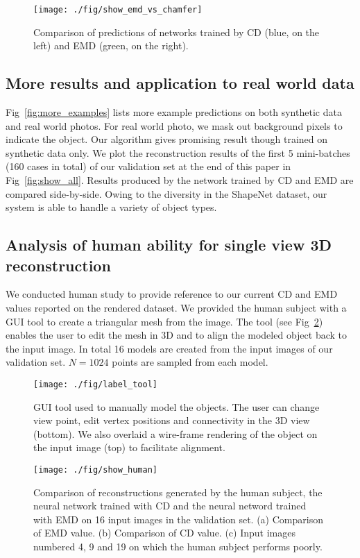 \documentclass[10pt,twocolumn,letterpaper]{article}
\begin{document}
\begin{figure}[ht!]
  \centering
  \texttt{[image: ./fig/show\_emd\_vs\_chamfer]}
  \caption{Comparison of predictions of networks trained by CD (blue, on the left) and EMD (green, on the right). }\label{fig:emd_vs_chamfer}
  \vspace{-1em}
\end{figure}\subsection{More results and application to real world data}\label{sec:exp:more}
 
Fig~\ref{fig:more_examples} lists more example predictions on both synthetic data and real world photos. For real world photo, we mask out background pixels to indicate the object. Our algorithm gives promising result though trained on synthetic data only.
We plot the reconstruction results of the first 5 mini-batches (160 cases in total) of our validation set at the end of this paper in Fig~\ref{fig:show_all}. Results produced by the network trained by CD and EMD are compared side-by-side. Owing to the diversity in the ShapeNet dataset, our system is able to handle a variety of object types.

\subsection{Analysis of human ability for single view 3D reconstruction}
We conducted human study to provide reference to our current CD and EMD values reported on the rendered dataset. We provided the human subject with a GUI tool to create a triangular mesh from the image. The tool (see Fig~\ref{fig:gui_tool}) enables the user to edit the mesh in 3D and to align the modeled object back to the input image. In total 16 models are created from the input images of our validation set. $N=1024$ points are sampled from each model.

\begin{figure}
\centering
\texttt{[image: ./fig/label\_tool]}
\caption{GUI tool used to manually model the objects. The user can change view point, edit vertex positions and connectivity in the 3D view (bottom). We also overlaid a wire-frame rendering of the object on the input image (top) to facilitate alignment.}
\label{fig:gui_tool}
\end{figure}\begin{figure}
\centering
\texttt{[image: ./fig/show\_human]}
\caption{Comparison of reconstructions generated by the human subject, the neural network trained with CD and the neural netword trained with EMD on 16 input images in the validation set. (a) Comparison of EMD value. (b) Comparison of CD value. (c) Input images numbered 4, 9 and 19 on which the human subject performs poorly.}
\label{fig:human_number}
\end{figure}
\end{document}

